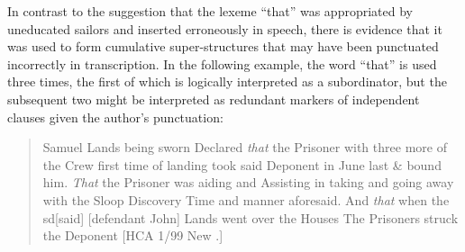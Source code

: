   In contrast to the suggestion that the lexeme “that” was appropriated by uneducated sailors and inserted erroneously in speech, there is evidence that it was used to form cumulative super-structures that may have been punctuated incorrectly in transcription. In the following example, the word “that” is used three times, the first of which is logically interpreted as a subordinator, but the subsequent two might be interpreted as redundant markers of independent clauses given the author’s punctuation:

\begin{quotation}
Samuel Lands being sworn Declared \textit{that} the Prisoner with three more of the Crew first time of landing took said Deponent in June last \& bound him. \textit{That} the Prisoner was aiding and Assisting in taking and going away with the Sloop Discovery Time and manner aforesaid. And \textit{that} when the sd[said] [defendant John] Lands went over the Houses The Prisoners struck the Deponent [HCA 1/99 New \citealt{Providence1722}.] \end{quotation}


